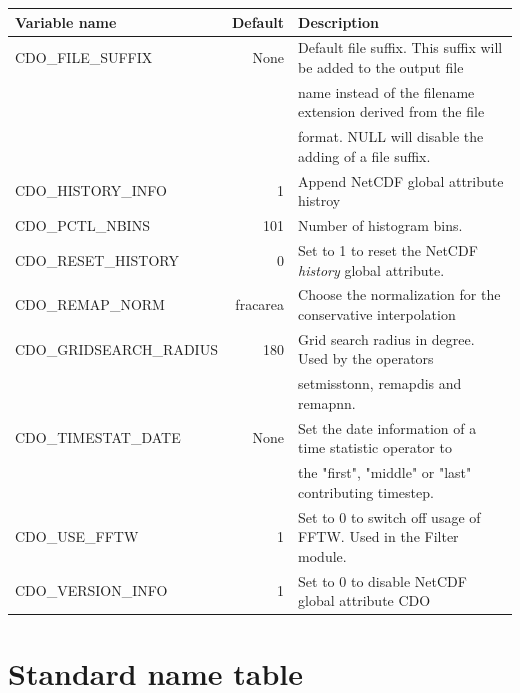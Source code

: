 \begin{tabular}[t]{|>{\columncolor{pcolor1}}l|r|l|}
\hline
\rowcolor{pcolor2}
{\bf Variable name}           &  {\bf Default} & {\bf Description} \\ \hline
CDO\_FILE\_SUFFIX             &   None   &  Default file suffix. This suffix will be added to the output file \\
                                           &               &  name instead of the filename extension derived from the file \\
                                           &               & format. NULL will disable the adding of a file suffix. \\ \hline
CDO\_HISTORY\_INFO        &         1   & Append NetCDF global attribute histroy \\ \hline
CDO\_PCTL\_NBINS            &     101    & Number of histogram bins. \\ \hline
CDO\_RESET\_HISTORY       &         0  & Set to 1 to reset the NetCDF {\it history} global attribute.\\ \hline
CDO\_REMAP\_NORM         &  fracarea & Choose the normalization for the conservative interpolation \\
CDO\_GRIDSEARCH\_RADIUS       &  180       & Grid search radius in degree. Used by the operators \\
                                                     &        & setmisstonn, 
                                                                remapdis and remapnn. \\ \hline
CDO\_TIMESTAT\_DATE     &  None   & Set the date information of a time statistic operator to \\
                                           &             &  the "first", "middle" or "last" contributing timestep.\\ \hline
CDO\_USE\_FFTW               &         1  & Set to 0 to switch off usage of FFTW. Used in the Filter module.\\ \hline
CDO\_VERSION\_INFO        &         1  & Set to 0 to disable NetCDF global attribute CDO \\ \hline
\end{tabular}





\chapter{\label{stdnametable}Standard name table}

